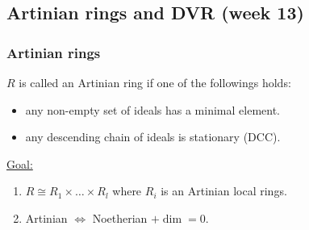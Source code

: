 \subsection{Artinian rings and DVR (week 13)}
\subsubsection{Artinian rings}

\begin{definition}
  $R$ is called an Artinian ring if one of the followings holds:
  \begin{itemize}
    \item any non-empty set of ideals has a minimal element.
    \item any descending chain of ideals is stationary (DCC).
  \end{itemize}
\end{definition}


\underline{Goal:}
\begin{enumerate}
  \item $R \cong R_1 \times \dots \times R_l$ where $R_i$ is an Artinian
    local rings.
  \item Artinian $\iff$ Noetherian $+ \dim = 0$.
\end{enumerate}

